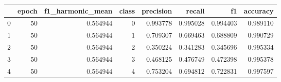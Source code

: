 \begin{tabular}{lrrrrrrr}
\toprule
 & epoch & f1_harmonic_mean & class & precision & recall & f1 & accuracy \\
\midrule
0 & 50 & 0.564944 & 0 & 0.993778 & 0.995028 & 0.994403 & 0.989110 \\
1 & 50 & 0.564944 & 1 & 0.709307 & 0.669463 & 0.688809 & 0.990729 \\
2 & 50 & 0.564944 & 2 & 0.350224 & 0.341283 & 0.345696 & 0.995334 \\
3 & 50 & 0.564944 & 3 & 0.468125 & 0.476749 & 0.472398 & 0.995378 \\
4 & 50 & 0.564944 & 4 & 0.753204 & 0.694812 & 0.722831 & 0.997597 \\
\bottomrule
\end{tabular}
